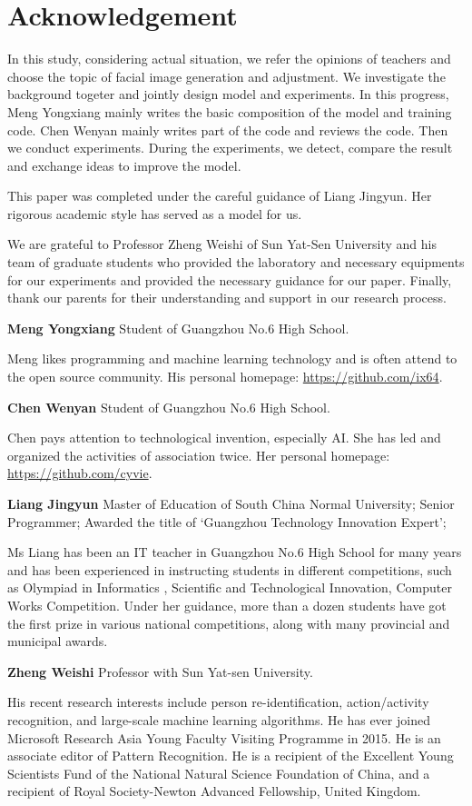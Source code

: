 \section*{Acknowledgement}

In this study, considering actual situation, we refer the opinions of teachers and choose the topic of facial image generation and adjustment. We investigate the background togeter and jointly design model and experiments. In this progress, Meng Yongxiang mainly writes the basic composition of the model and training code. Chen Wenyan mainly writes part of the code and reviews the code. Then we conduct experiments. During the experiments, we detect, compare the result and exchange ideas to improve the model.

This paper was completed under the careful guidance of Liang Jingyun. Her rigorous academic style has served as a model for us.

We are grateful to Professor Zheng Weishi of Sun Yat-Sen University and his team of graduate students who provided the laboratory and necessary equipments for our experiments and provided the necessary guidance for our paper.
Finally, thank our parents for their understanding and support in our research process.

\vspace{4ex}


\textbf{Meng Yongxiang}  Student of Guangzhou No.6 High School.

Meng likes programming and machine learning technology and is often attend to the open source community. His personal homepage: \url{https://github.com/ix64}.


\textbf{Chen Wenyan}  Student of Guangzhou No.6 High School.

Chen pays attention to technological invention, especially AI. She has led and organized the activities of association twice.  Her personal homepage: \url{https://github.com/cyvie}.


\textbf{Liang Jingyun}  Master of Education of South China Normal University;
Senior Programmer;
Awarded the title of ‘Guangzhou Technology Innovation Expert’;

Ms Liang has been an IT teacher in Guangzhou No.6 High School for many years and has been experienced in instructing students in different competitions, such as Olympiad in Informatics , Scientific and Technological Innovation, Computer Works Competition. Under her guidance, more than a dozen students have got the first prize in various national competitions, along with many provincial and municipal awards.


\textbf{Zheng Weishi}  Professor with Sun Yat-sen University.

His recent research interests include person re-identification, action/activity recognition, and large-scale machine learning algorithms.
He has ever joined Microsoft Research Asia Young Faculty Visiting Programme in 2015.
He is an associate editor of Pattern Recognition.
He is a recipient of the Excellent Young Scientists Fund of the National Natural Science Foundation of China,
    and a recipient of Royal Society-Newton Advanced Fellowship, United Kingdom.

